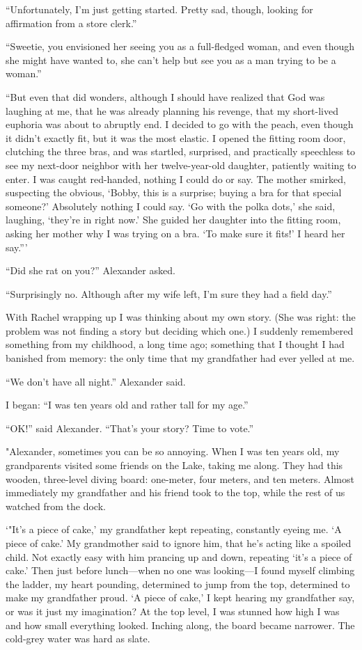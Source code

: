 ``Unfortunately, I'm just getting started. Pretty sad, though, looking
for affirmation from a store clerk.''

``Sweetie, you envisioned her seeing you as a full-fledged woman, and
even though she might have wanted to, she can't help but see you as a
man trying to be a woman.''

``But even that did wonders, although I should have realized that God
was laughing at me, that he was already planning his revenge, that my
short-lived euphoria was about to abruptly end. I decided to go with the
peach, even though it didn't exactly fit, but it was the most elastic. I
opened the fitting room door, clutching the three bras, and was
startled, surprised, and practically speechless to see my next-door
neighbor with her twelve-year-old daughter, patiently waiting to enter.
I was caught red-handed, nothing I could do or say. The mother smirked,
suspecting the obvious, `Bobby, this is a surprise; buying a bra for
that special someone?' Absolutely nothing I could say. `Go with the
polka dots,' she said, laughing, `they're in right now.' She guided her
daughter into the fitting room, asking her mother why I was trying on a
bra. `To make sure it fits!' I heard her say.'''

``Did she rat on you?'' Alexander asked.

``Surprisingly no. Although after my wife left, I'm sure they had a
field day.''

With Rachel wrapping up I was thinking about my own story. (She was
right: the problem was not finding a story but deciding which one.) I
suddenly remembered something from my childhood, a long time ago;
something that I thought I had banished from memory: the only time that
my grandfather had ever yelled at me.

``We don't have all night.'' Alexander said.

I began: ``I was ten years old and rather tall for my age.''

``OK!'' said Alexander. ``That's your story? Time to vote.''

"Alexander, sometimes you can be so annoying. When I was ten years old,
my grandparents visited some friends on the Lake, taking me along. They
had this wooden, three-level diving board: one-meter, four meters, and
ten meters. Almost immediately my grandfather and his friend took to the
top, while the rest of us watched from the dock.

`"It's a piece of cake,' my grandfather kept repeating, constantly
eyeing me. `A piece of cake.' My grandmother said to ignore him, that
he's acting like a spoiled child. Not exactly easy with him prancing up
and down, repeating `it's a piece of cake.' Then just before
lunch---when no one was looking---I found myself climbing the ladder, my
heart pounding, determined to jump from the top, determined to make my
grandfather proud. `A piece of cake,' I kept hearing my grandfather say,
or was it just my imagination? At the top level, I was stunned how high
I was and how small everything looked. Inching along, the board became
narrower. The cold-grey water was hard as slate.

